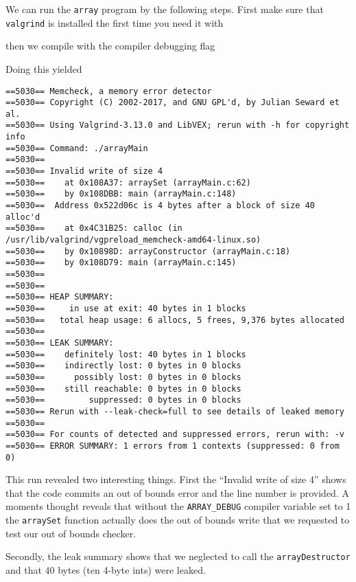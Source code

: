 We can run the \texttt{array} program by the following steps. First make sure that \texttt{valgrind} is installed the first time you need it with


then we compile with the compiler debugging flag

Doing this yielded
\begin{Verbatim}[frame=single]
==5030== Memcheck, a memory error detector
==5030== Copyright (C) 2002-2017, and GNU GPL'd, by Julian Seward et al.
==5030== Using Valgrind-3.13.0 and LibVEX; rerun with -h for copyright info
==5030== Command: ./arrayMain
==5030== 
==5030== Invalid write of size 4
==5030==    at 0x108A37: arraySet (arrayMain.c:62)
==5030==    by 0x108DBB: main (arrayMain.c:148)
==5030==  Address 0x522d06c is 4 bytes after a block of size 40 alloc'd
==5030==    at 0x4C31B25: calloc (in /usr/lib/valgrind/vgpreload_memcheck-amd64-linux.so)
==5030==    by 0x10898D: arrayConstructor (arrayMain.c:18)
==5030==    by 0x108D79: main (arrayMain.c:145)
==5030== 
==5030== 
==5030== HEAP SUMMARY:
==5030==     in use at exit: 40 bytes in 1 blocks
==5030==   total heap usage: 6 allocs, 5 frees, 9,376 bytes allocated
==5030== 
==5030== LEAK SUMMARY:
==5030==    definitely lost: 40 bytes in 1 blocks
==5030==    indirectly lost: 0 bytes in 0 blocks
==5030==      possibly lost: 0 bytes in 0 blocks
==5030==    still reachable: 0 bytes in 0 blocks
==5030==         suppressed: 0 bytes in 0 blocks
==5030== Rerun with --leak-check=full to see details of leaked memory
==5030== 
==5030== For counts of detected and suppressed errors, rerun with: -v
==5030== ERROR SUMMARY: 1 errors from 1 contexts (suppressed: 0 from 0)
\end{Verbatim}

This run revealed two interesting things. First the ``Invalid write of size 4'' shows that the code commits an out of bounds error and the line number is provided. A moments thought reveals that without the \texttt{ARRAY\_DEBUG} compiler variable set to 1 the \texttt{arraySet} function actually does the out of bounds write that we requested to test our  out of bounds checker.

Secondly, the leak summary shows that  we neglected to call the \texttt{arrayDestructor} and that 40 bytes (ten 4-byte ints) were leaked. 